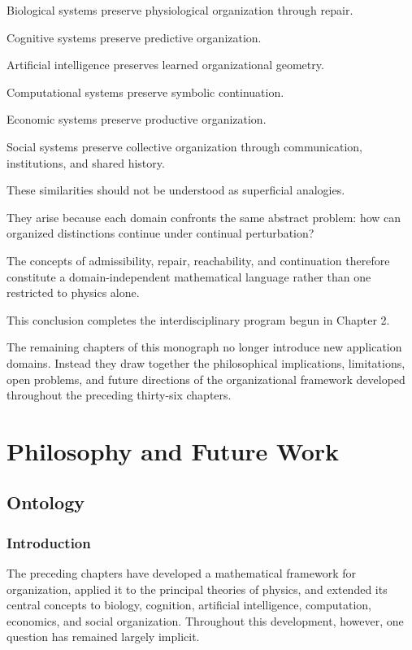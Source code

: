 \documentclass[11pt,oneside]{book}
\numberwithin{equation}{chapter}
\theoremstyle{definition}
\theoremstyle{plain}
\begin{document}
Biological systems preserve physiological organization through repair.

Cognitive systems preserve predictive organization.

Artificial intelligence preserves learned organizational geometry.

Computational systems preserve symbolic continuation.

Economic systems preserve productive organization.

Social systems preserve collective organization through communication,
institutions, and shared history.

These similarities should not be understood as superficial analogies.

They arise because each domain confronts the same abstract problem: how can
organized distinctions continue under continual perturbation?

The concepts of admissibility, repair, reachability, and continuation
therefore constitute a domain-independent mathematical language rather than
one restricted to physics alone.

This conclusion completes the interdisciplinary program begun in Chapter 2.

The remaining chapters of this monograph no longer introduce new
application domains. Instead they draw together the philosophical
implications, limitations, open problems, and future directions of the
organizational framework developed throughout the preceding thirty-six
chapters.

\part{Philosophy and Future Work}

\chapter{Ontology}

\section{Introduction}

The preceding chapters have developed a mathematical framework for
organization, applied it to the principal theories of physics, and extended
its central concepts to biology, cognition, artificial intelligence,
computation, economics, and social organization. Throughout this
development, however, one question has remained largely implicit.
\end{document}
